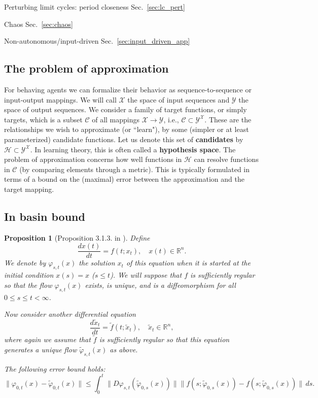 \documentclass{article}
\newtheorem{proposition}{Proposition}
\theoremstyle{definition} \newtheorem{definition}{Definition}
\theoremstyle{remark} \newtheorem{remark}{Remark}
\newcounter{ct}
\begin{document}
Perturbing limit cycles: period closeness Sec.~\ref{sec:lc_pert}

Chaos Sec.~\ref{sec:chaos} 

Non-autonomous/input-driven Sec.~\ref{sec:input_driven_app} 

\subsection{The problem of approximation}\label{sec:approximationtheory} %
For behaving agents we can formalize their behavior as sequence-to-sequence or input-output mappings.
We will call $\mathcal{X}$ the space of input sequences and $\mathcal{Y}$ the space of output sequences.
We consider a family of target functions, or simply targets, which is a subset \(\mathcal{C} \) of all mappings \( \mathcal{X} \rightarrow \mathcal{Y} \), i.e., \( \mathcal{C} \subset \mathcal{Y}^\mathcal{X} \). 
These are the relationships we wish to approximate (or ``learn"), by some (simpler or at least parameterized) candidate functions.
Let us denote this set of \textbf{candidates} by \( \mathcal{H} \subset \mathcal{Y}^\mathcal{X} \).
In learning theory, this is often called a \textbf{hypothesis space}.
The problem of approximation concerns how well functions in \( \mathcal{H} \) can resolve functions in \( \mathcal{C} \) (by comparing elements through a metric).
This is typically formulated in terms of a bound on the (maximal) error between the approximation and the target mapping.

\subsection{In basin bound}\label{sec:313}
\begin{proposition}[Proposition 3.1.3. in \citep{vanhandel2007filtering}]\label{prop:313}
Define 
\[
\frac{d x(t)}{d t} = f(t; x_t), \quad x(t) \in \mathbb{R}^n.
\]
We denote by $\varphi_{s,t}(x)$ the solution $x_t$ of this equation when it is started at the initial condition $x(s) = x$ ($s \leq t$). We will suppose that $f$ is sufficiently regular so that the flow $\varphi_{s,t}(x)$ exists, is unique, and is a diffeomorphism for all $0 \leq s \leq t < \infty$.

Now consider another differential equation 
\[
\frac{d \tilde{x}_t}{d t} = \tilde{f}(t; \tilde{x}_t), \quad \tilde{x}_t \in \mathbb{R}^n,
\]
where again we assume that $\tilde{f}$ is sufficiently regular so that this equation generates a unique flow $\tilde{\varphi}_{s,t}(x)$ as above.


The following error bound holds:
\[
\|\varphi_{0,t}(x) - \tilde{\varphi}_{0,t}(x)\| \leq \int_0^t \|D\varphi_{s,t}(\tilde{\varphi}_{0,s}(x))\| \|f(s; \tilde{\varphi}_{0,s}(x)) - f(s; \tilde{\varphi}_{0,s}(x))\| \, ds.
\]
\end{proposition}
\end{document}
